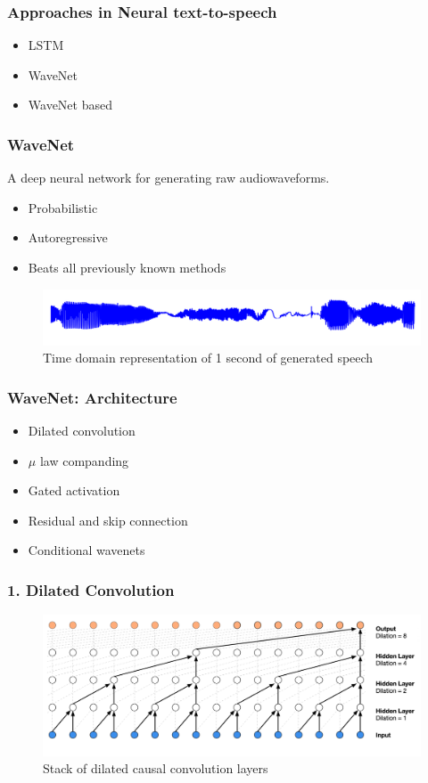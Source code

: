 \documentclass{beamer}
\begin{document}
  \begin{frame}
    \frametitle{Approaches in Neural text-to-speech}
      \begin{itemize}
          \item LSTM
          \item WaveNet
          \item WaveNet based
      \end{itemize}
  \end{frame}

  \begin{frame}
    \frametitle{WaveNet}
      A deep neural network for generating raw audiowaveforms.

      \begin{itemize}
        \item Probabilistic 
        \item Autoregressive
        \item Beats all previously known methods
      \end{itemize}
      \begin{figure}
        \centering
        \includegraphics[width=\textwidth]{images/second_of_speech.png}
        \caption{Time domain representation of 1 second of generated speech}
      \end{figure}
  \end{frame}

  \begin{frame}
    \frametitle{WaveNet: Architecture}
      \begin{itemize}
        \item Dilated convolution
        \item $\mu$ law companding
        \item Gated activation
        \item Residual and skip connection
        \item Conditional wavenets
      \end{itemize}
  \end{frame}

  \begin{frame}
    \frametitle{1. Dilated Convolution}
    \begin{figure}
      \includegraphics[scale=0.22]{images/wavenet_arch_dilated_conv.png}
      \caption{Stack of dilated causal convolution layers}
    \end{figure}
  \end{frame}
\end{document}
